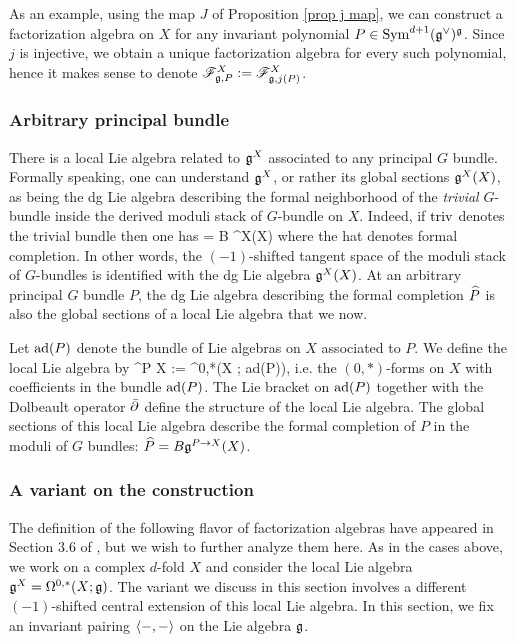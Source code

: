 \begin{eg} As an example, using the map $J$ of Proposition \ref{prop j map}, we can construct a factorization algebra on $X$ for any invariant polynomial $P \in \Sym^{d+1}(\fg^\vee)^\fg$. Since $j$ is injective, we obtain a unique factorization algebra for every such polynomial, hence it makes sense to denote $\sF^X_{\fg, P} := \sF^X_{\fg,j(P)}$. 
\end{eg}

\subsubsection{Arbitrary principal bundle}

There is a local Lie algebra related to $\fg^X$ associated to any principal $G$ bundle. Formally speaking, one can understand $\fg^X$, or rather its global sections $\fg^X(X)$, as being the dg Lie algebra describing the formal neighborhood of the {\em trivial} $G$-bundle inside the derived moduli stack of $G$-bundle on $X$. Indeed, if ${\rm triv}$ denotes the trivial bundle then one has
\ben
{} = B \fg^X(X)
\een
where the hat denotes formal completion. In other words, the $(-1)$-shifted tangent space of the moduli stack of $G$-bundles is identified with the dg Lie algebra $\fg^X(X)$. At an arbitrary principal $G$ bundle $P$, the dg Lie algebra describing the formal completion $\Hat{P}$ is also the global sections of a local Lie algebra that we now. 

Let ${\rm ad}(P)$ denote the bundle of Lie algebras on $X$ associated to $P$. We define the local Lie algebra by
\ben
\fg^{P \to X} := \Omega^{0,*}(X ; {\rm ad}(P)),
\een 
i.e. the $(0,*)$-forms on $X$ with coefficients in the bundle ${\rm ad}(P)$. The Lie bracket on ${\rm ad}(P)$ together with the Dolbeault operator $\dbar$ define the structure of the local Lie algebra. The global sections of this local Lie algebra describe the formal completion of $P$ in the moduli of $G$ bundles: $\Hat{P} = B \fg^{P \to X}(X)$. 

\subsubsection{A variant on the construction}

The definition of the following flavor of factorization algebras have appeared in Section 3.6 of \cite{book1}, but we wish to further analyze them here. As in the cases above, we work on a complex $d$-fold $X$ and consider the local Lie algebra $\fg^X = \Omega^{0,*}(X; \fg)$. The variant we discuss in this section involves a different $(-1)$-shifted central extension of this local Lie algebra. In this section, we fix an invariant pairing $\<-,-\>$ on the Lie algebra $\fg$. 

